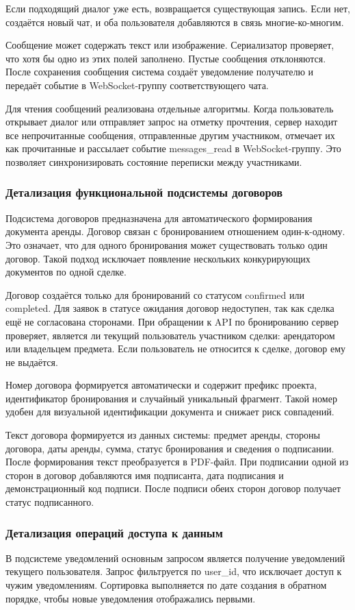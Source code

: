 Если подходящий диалог уже есть, возвращается существующая запись. Если нет, создаётся новый чат, и оба пользователя добавляются в связь многие-ко-многим.

Сообщение может содержать текст или изображение. Сериализатор проверяет, что хотя бы одно из этих полей заполнено. Пустые сообщения отклоняются. После сохранения сообщения система создаёт уведомление получателю и передаёт событие в WebSocket-группу соответствующего чата.

Для чтения сообщений реализована отдельные алгоритмы. Когда пользователь открывает диалог или отправляет запрос на отметку прочтения, сервер находит все непрочитанные сообщения, отправленные другим участником, отмечает их как прочитанные и рассылает событие messages\_read в WebSocket-группу. Это позволяет синхронизировать состояние переписки между участниками.

\subsubsection{Детализация функциональной подсистемы договоров}
Подсистема договоров предназначена для автоматического формирования документа аренды. Договор связан с бронированием отношением один-к-одному. Это означает, что для одного бронирования может существовать только один договор. Такой подход исключает появление нескольких конкурирующих документов по одной сделке.

Договор создаётся только для бронирований со статусом confirmed или completed. Для заявок в статусе ожидания договор недоступен, так как сделка ещё не согласована сторонами. При обращении к API по бронированию сервер проверяет, является ли текущий пользователь участником сделки: арендатором или владельцем предмета. Если пользователь не относится к сделке, договор ему не выдаётся.

Номер договора формируется автоматически и содержит префикс проекта, идентификатор бронирования и случайный уникальный фрагмент. Такой номер удобен для визуальной идентификации документа и снижает риск совпадений.

Текст договора формируется из данных системы: предмет аренды, стороны договора, даты аренды, сумма, статус бронирования и сведения о подписании. После формирования текст преобразуется в PDF-файл. При подписании одной из сторон в договор добавляются имя подписанта, дата подписания и демонстрационный код подписи. После подписи обеих сторон договор получает статус подписанного.

\subsubsection{Детализация операций доступа к данным}
В подсистеме уведомлений основным запросом является получение уведомлений текущего пользователя. Запрос фильтруется по user\_id, что исключает доступ к чужим уведомлениям. Сортировка выполняется по дате создания в обратном порядке, чтобы новые уведомления отображались первыми.

